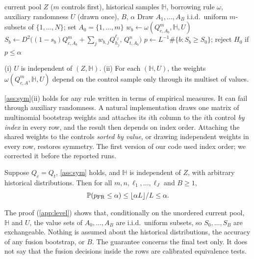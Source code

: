\documentclass[11pt,a4paper]{article}
\begin{document}
\begin{algorithm}[t]
\caption{Full-reselection partial permutation test}\label{alg:fr}
\begin{algorithmic}[1]
\Require current pool $Z$ ($m$ controls first), historical samples $\mathbb H$, borrowing rule $\omega$, auxiliary randomness $U$ (drawn once), $B$, $\alpha$
\State Draw $A_1,\dots,A_B$ i.i.d.\ uniform $m$-subsets of $\{1,\dots,N\}$; set $A_0=\{1,\dots,m\}$
\State $w_b\gets\omega(Q^m_{c,A_b},\mathbb H,U)$ 
\State $S_b\gets D^2\big((1-s_b)Q^m_{c,A_b}+\sum_jw_{b,j}Q^{\ell_j}_{h_j},\,Q^n_{t,A_b}\big)$
\EndFor
\State $p\gets L^{-1}\#\{b:S_b\ge S_0\}$; reject $H_0$ if $p\le\alpha$
\end{algorithmic}
\end{algorithm}

\begin{assumption}\label{ass:sym}
(i) $U$ is independent of $(Z,\mathbb H)$. (ii) For each $(\mathbb H,U)$, the weights $\omega(Q^m_{c,A},\mathbb H,U)$ depend on the control sample only through its multiset of values.
\end{assumption}

\cref{ass:sym}(ii) holds for any rule written in terms of empirical measures. It can fail through auxiliary randomness. A natural implementation draws one matrix of multinomial bootstrap weights and attaches its $i$th column to the $i$th control \emph{by index} in every row, and the result then depends on index order. Attaching the shared weights to the controls \emph{sorted by value}, or drawing independent weights in every row, restores symmetry. The first version of our code used index order; we corrected it before the reported runs.

\begin{theorem}\label{thm:level}
Suppose $Q_c=Q_t$, \cref{ass:sym} holds, and $\mathbb H$ is independent of $Z$, with arbitrary historical distributions. Then for all $m,n,\ell_1,\dots,\ell_J$ and $B\ge1$,
\[
\P(p_{\rm FR}\le\alpha)\le\lfloor\alpha L\rfloor/L\le\alpha .
\]
\end{theorem}

The proof (\cref{app:level}) shows that, conditionally on the unordered current pool, $\mathbb H$ and $U$, the value sets of $A_0,\dots,A_B$ are i.i.d.\ uniform subsets, so $S_0,\dots,S_B$ are exchangeable. Nothing is assumed about the historical distributions, the accuracy of any fusion bootstrap, or $B$. The guarantee concerns the final test only. It does not say that the fusion decisions inside the rows are calibrated equivalence tests.
\end{document}
